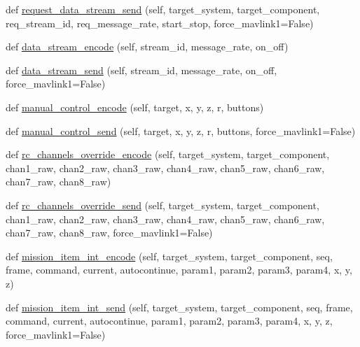 \begin{DoxyCompactItemize}
def \hyperlink{classpymavlink_1_1dialects_1_1v10_1_1MAVLink_a3cb280ef30de5b5b3d22b3bf10b43d15}{request\+\_\+data\+\_\+stream\+\_\+send} (self, target\+\_\+system, target\+\_\+component, req\+\_\+stream\+\_\+id, req\+\_\+message\+\_\+rate, start\+\_\+stop, force\+\_\+mavlink1=False)
\item 
def \hyperlink{classpymavlink_1_1dialects_1_1v10_1_1MAVLink_a8b4c0cb9ff7c0c271602f3690549dff8}{data\+\_\+stream\+\_\+encode} (self, stream\+\_\+id, message\+\_\+rate, on\+\_\+off)
\item 
def \hyperlink{classpymavlink_1_1dialects_1_1v10_1_1MAVLink_a998519d240b758d15071c5285ccf05df}{data\+\_\+stream\+\_\+send} (self, stream\+\_\+id, message\+\_\+rate, on\+\_\+off, force\+\_\+mavlink1=False)
\item 
def \hyperlink{classpymavlink_1_1dialects_1_1v10_1_1MAVLink_a391fcb42217715957b2f08902102e9f3}{manual\+\_\+control\+\_\+encode} (self, target, x, y, z, r, buttons)
\item 
def \hyperlink{classpymavlink_1_1dialects_1_1v10_1_1MAVLink_aefb5e7c39173cdfaa3ff7fe746b22a85}{manual\+\_\+control\+\_\+send} (self, target, x, y, z, r, buttons, force\+\_\+mavlink1=False)
\item 
def \hyperlink{classpymavlink_1_1dialects_1_1v10_1_1MAVLink_ae06404060634f3fd475d65af2bd1cd11}{rc\+\_\+channels\+\_\+override\+\_\+encode} (self, target\+\_\+system, target\+\_\+component, chan1\+\_\+raw, chan2\+\_\+raw, chan3\+\_\+raw, chan4\+\_\+raw, chan5\+\_\+raw, chan6\+\_\+raw, chan7\+\_\+raw, chan8\+\_\+raw)
\item 
def \hyperlink{classpymavlink_1_1dialects_1_1v10_1_1MAVLink_a8ab04b7f0f411d1864e77fdd3c441156}{rc\+\_\+channels\+\_\+override\+\_\+send} (self, target\+\_\+system, target\+\_\+component, chan1\+\_\+raw, chan2\+\_\+raw, chan3\+\_\+raw, chan4\+\_\+raw, chan5\+\_\+raw, chan6\+\_\+raw, chan7\+\_\+raw, chan8\+\_\+raw, force\+\_\+mavlink1=False)
\item 
def \hyperlink{classpymavlink_1_1dialects_1_1v10_1_1MAVLink_a02e8ceffd1df8f945d53ff9c5e311f74}{mission\+\_\+item\+\_\+int\+\_\+encode} (self, target\+\_\+system, target\+\_\+component, seq, frame, command, current, autocontinue, param1, param2, param3, param4, x, y, z)
\item 
def \hyperlink{classpymavlink_1_1dialects_1_1v10_1_1MAVLink_ac7cc730d070cee5caa270855d48275a8}{mission\+\_\+item\+\_\+int\+\_\+send} (self, target\+\_\+system, target\+\_\+component, seq, frame, command, current, autocontinue, param1, param2, param3, param4, x, y, z, force\+\_\+mavlink1=False)

\end{DoxyCompactItemize}
